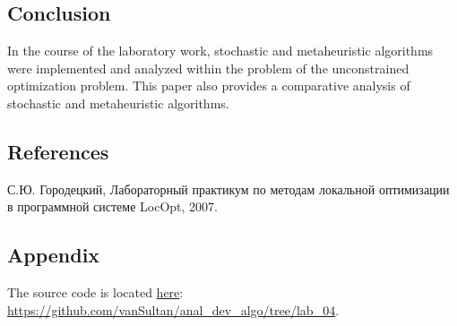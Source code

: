 \subsection{Conclusion}\label{subsec:conclusion}

In the course of the laboratory work, stochastic and metaheuristic algorithms were implemented and analyzed within the problem of the unconstrained optimization problem.
This paper also provides a comparative analysis of stochastic and metaheuristic algorithms.

\subsection{References}\label{subsec:references}
\begin{enumerate}[label={[\arabic*]}]
    \item С.Ю. Городецкий, Лабораторный практикум по методам локальной оптимизации в программной системе LocOpt, 2007.
\end{enumerate}

\subsection{Appendix}\label{subsec:appendix}

The source code is located \href{https://github.com/vanSultan/anal_dev_algo/tree/lab_04}{here}: \url{https://github.com/vanSultan/anal_dev_algo/tree/lab_04}.
